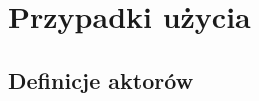 \documentclass[12pt,a4paper]{article}
\begin{document}
% 


\tableofcontents
\newpage


\setlength{\parindent}{0pt} %

\section{Przypadki użycia}

\subsection{Definicje aktorów}

    
\end{document}
